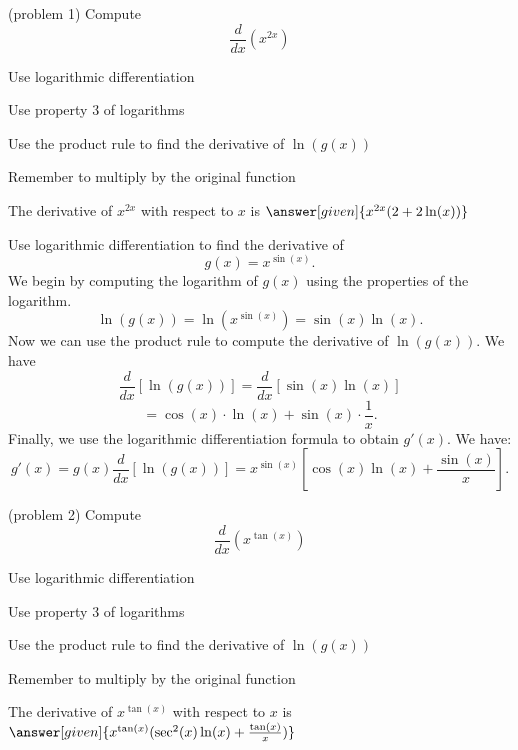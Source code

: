 \documentclass{ximera}
\begin{document}
\begin{problem}(problem 1)
  Compute
  \[
  \frac{d}{dx} \left(x^{2x}\right)
  \]
  
    \begin{hint}
      Use logarithmic differentiation
    \end{hint}
    \begin{hint}
      Use property 3 of logarithms
    \end{hint}
    \begin{hint}
		  Use the product rule to find the derivative of $\ln(g(x))$
		\end{hint}
		\begin{hint}
		  Remember to multiply by the original function
		\end{hint}
    
		The derivative of $x^{2x}$ with respect to $x$ is
		 $\answer[given]{x^{2x} (2+2\ln(x))}$
		
\end{problem}

\begin{example}[example 2]
Use logarithmic differentiation to find the derivative of 
\[
g(x) = x^{\sin(x)}.
\]
We begin by computing the logarithm of $g(x)$ using the properties of the logarithm.
\[
\ln(g(x)) = \ln\left(x^{\sin(x)}\right) = \sin(x)\ln(x).
\]
Now we can use the product rule to compute the derivative of $\ln(g(x))$.
We have
\[
\frac{d}{dx} \left[\ln(g(x))\right] = \frac{d}{dx} \left[\sin(x)\ln(x)\right]
\]
\[
= \cos(x)\cdot \ln(x) + \sin(x) \cdot \frac{1}{x}.
\]
Finally, we use the logarithmic differentiation formula to obtain $g'(x)$.
We have:
\[
g'(x) = g(x) \frac{d}{dx} \left[\ln(g(x))\right] = x^{\sin(x)} \left[\cos(x)\ln(x) + \frac{\sin(x)}{x}\right].
\]

\end{example}


\begin{problem}(problem 2)
  Compute
  \[
  \frac{d}{dx} \left(x^{\tan(x)}\right)
  \]
  
    \begin{hint}
      Use logarithmic differentiation
    \end{hint}
    \begin{hint}
      Use property 3 of logarithms
    \end{hint}
    \begin{hint}
		  Use the product rule to find the derivative of $\ln(g(x))$
		\end{hint}
		\begin{hint}
		  Remember to multiply by the original function
		\end{hint}
    
		The derivative of $x^{\tan(x)}$ with respect to $x$ is
		 $\answer[given]{x^{\tan(x)} (\sec^2(x)\ln(x) + \frac{\tan(x)}{x})}$
		
\end{problem}
\end{document}
